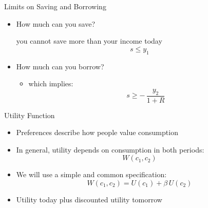 \documentclass[10pt,aspectratio=169]{beamer}
\begin{document}
\begin{frame}{Limits on Saving and Borrowing}

\begin{itemize}
    \item How much can you save?
    \begin{itemize}
        \itemvso you cannot save more than your income today
        \[
        s \le y_1
        \]
    \end{itemize}
    \item How much can you borrow?
    \begin{itemize}
        \itemvso you must be able to repay tomorrow
        \[
        (1+R)s \ge -\,y_2
        \]
        \item[] which implies:
        \[
        s \ge -\,\frac{y_2}{1+R}
        \]
    \end{itemize}
\end{itemize}

\end{frame}


\begin{frame}{Utility Function}

\begin{itemize}
    \item Preferences describe how people value consumption
    \vspace{0.3cm}

    \item In general, utility depends on consumption in both periods:
    \[
    W(c_1, c_2)
    \]
    \vspace{-0.3cm}

    \item We will use a simple and common specification:
    \[
    W(c_1, c_2)=U(c_1) + \beta\, U(c_2)
    \]
    \vspace{-0.3cm}

    \item Utility today plus discounted utility tomorrow
\end{itemize}

\end{frame}
\end{document}
